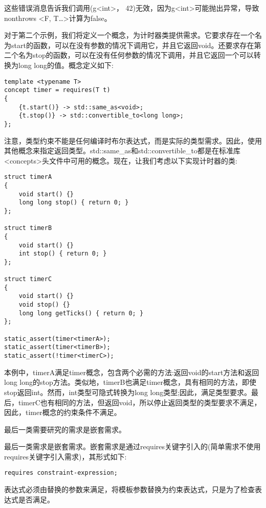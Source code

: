 这些错误消息告诉我们调用(g<int>， 42)无效，因为g<int>可能抛出异常，导致nonthrows <F, T…>计算为false。

对于第二个示例，我们将定义一个概念，为计时器类提供需求。它要求存在一个名为start的函数，可以在没有参数的情况下调用它，并且它返回void。还要求存在第二个名为stop的函数，可以在没有任何参数的情况下调用，并且它返回一个可以转换为long long的值。概念定义如下:

\begin{lstlisting}[style=styleCXX]
template <typename T>
concept timer = requires(T t)
{
	{t.start()} -> std::same_as<void>;
	{t.stop()} -> std::convertible_to<long long>;
};
\end{lstlisting}

注意，类型约束不能是任何编译时布尔表达式，而是实际的类型需求。因此，使用其他概念来指定返回类型。std::same\_as和std::convertible\_to都是在标准库<concepts>头文件中可用的概念。现在，让我们考虑以下实现计时器的类:

\begin{lstlisting}[style=styleCXX]
struct timerA
{
	void start() {}
	long long stop() { return 0; }
};

struct timerB
{
	void start() {}
	int stop() { return 0; }
};

struct timerC
{
	void start() {}
	void stop() {}
	long long getTicks() { return 0; }
};

static_assert(timer<timerA>);
static_assert(timer<timerB>);
static_assert(!timer<timerC>);
\end{lstlisting}

本例中，timerA满足timer概念，包含两个必需的方法:返回void的start方法和返回long long的stop方法。类似地，timerB也满足timer概念，具有相同的方法，即使stop返回int。然而，int类型可隐式转换为long long类型;因此，满足类型要求。最后，timerC也有相同的方法，但返回void，所以停止返回类型的类型要求不满足，因此，timer概念的约束条件不满足。

最后一类需要研究的需求是嵌套需求。


最后一类需求是嵌套需求。嵌套需求是通过requires关键字引入的(简单需求不使用requires关键字引入需求)，其形式如下:

\begin{lstlisting}[style=styleCXX]
requires constraint-expression;
\end{lstlisting}

表达式必须由替换的参数来满足，将模板参数替换为约束表达式，只是为了检查表达式是否满足。

